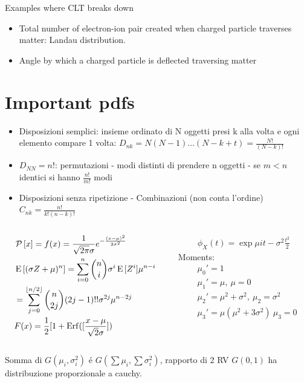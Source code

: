 \documentclass[asd-beamer.tex]{subfiles}%
\begin{document}
\begin{frame}{Examples where CLT breaks down}
\begin{itemize}
\item Total number of electron-ion pair created when charged particle traverses matter: Landau distribution.
\item Angle by which a charged particle is deflected traversing matter
\end{itemize}
\end{frame}

\section{Important pdfs}

\begin{wordonframe}{}
\begin{itemize}
    \item Disposizioni semplici: insieme ordinato di N oggetti presi k alla volta e ogni elemento compare 1 volta: $D_{nk}=N(N-1)\ldots(N-k+t)=\frac{N!}{(N-k)!}$
    \item $D_{NN}=n!$: permutazioni - modi distinti di prendere n oggetti - se $m<n$ identici si hanno $\frac{n!}{m!}$ modi
\item Disposizioni senza ripetizione - Combinazioni (non conta l'ordine) $C_{nk}=\frac{n!}{k!(n-k)!}$
\end{itemize}
\end{wordonframe}

\begin{frame}{}
	\begin{columns}[T]
		\begin{column}{0.5\textwidth}
			\begin{align*}
			&\operatorname{\mathcal{P}}{[x]}=f(x)=\frac{1}{\sqrt{2\pi}\sigma}e^{-\frac{(x-\mu)^2}{2\sigma^2}}\\
			&\operatorname{E}{[(\sigma Z+\mu)^n]}=\sum_{i=0}^n\binom{n}{i}\sigma^i\operatorname{E}{[Z^i]}\mu^{n-i}\\
			&=\sum_{j=0}^{\lfloor n/2\rfloor}\binom{n}{2j}(2j-1)!!\sigma^{2j}\mu^{n-2j}\\
			&F(x)=\frac{1}{2}[1+\operatorname{Erf}([\frac{x-\mu}{\sqrt{2}\sigma}])
			\end{align*}
		\end{column}
		\begin{column}{0.5\textwidth}
			\begin{align*}
			\phi_X(t)=\exp{\mu it-\sigma^2\frac{t^2}{2}}
			\end{align*}
			Moments:
			\begin{align*}
			&\mu_0'=1\\
            &\mu_1'=\mu,\ \mu=0\\
            &\mu_2'=\mu^2+\sigma^2,\ \mu_2=\sigma^2\\
			&\mu_3'=\mu(\mu^2+3\sigma^2)\ \mu_3=0
			\end{align*}
		\end{column}
	\end{columns}
    Somma di $G(\mu_i,\sigma_i^2)$ \'e $G(\sum\mu_i,\sum\sigma_i^2)$, rapporto di 2 RV $G(0,1)$ ha distribuzione proporzionale a cauchy.
\end{frame}
\end{document}

